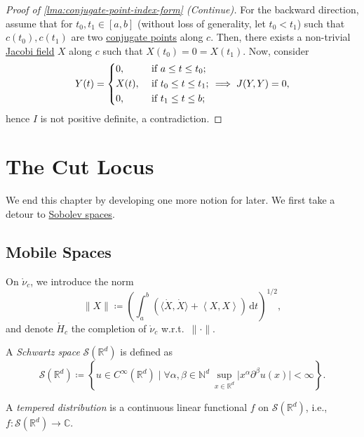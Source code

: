 \begin{proof}[Proof of \autoref{lma:conjugate-point-index-form} (Continue)]
	For the backward direction, assume that for \(t_0, t_1\in [a, b]\) (without loss of generality, let \(t_0 < t_1\)) such that \(c(t_0), c(t_1)\) are two \hyperref[def:conjugate-point]{conjugate points} along \(c\). Then, there exists a non-trivial \hyperref[def:Jacobi-field]{Jacobi field} \(X\) along \(c\) such that \(X(t_0) = 0 = X(t_1)\). Now, consider
	\[
		Y(t) = \begin{dcases}
			0,    & \text{ if } a \leq t \leq t_0 ;   \\
			X(t), & \text{ if } t_0 \leq t \leq t_1 ; \\
			0,    & \text{ if } t_1 \leq t \leq b;
		\end{dcases} \implies J(Y, Y) = 0,
	\]
	hence \(I\) is not positive definite, a contradiction.
\end{proof}

\section{The Cut Locus}
We end this chapter by developing one more notion for later. We first take a detour to \hyperref[def:Sobolev-space]{Sobolev spaces}.

\subsection{Mobile Spaces}
On \(\mathring{\nu }_c\), we introduce the norm
\[
	\lVert X \rVert \coloneqq \left( \int_{a}^{b} \left( \langle \dot{X} , \dot{X} \rangle + \left\langle X, X \right\rangle  \right)  \,\mathrm{d}t \right) ^{1 / 2},
\]
and denote \(\mathring{H}_c\) the completion of \(\mathring{\nu}_c\) w.r.t.\ \(\lVert \cdot \rVert \).

\begin{definition}\label{def:Schwartz-space}
	A \emph{Schwartz space} \(\mathcal{S} (\mathbb{R} ^d)\) is defined as
	\[
		\mathcal{S} (\mathbb{R} ^d) \coloneqq \left\{ u\in C^{\infty} (\mathbb{R} ^d) \mid \forall \alpha , \beta \in \mathbb{N} ^d\ \sup _{x\in \mathbb{R} ^d} \vert x^\alpha \partial ^\beta u(x) \vert < \infty  \right\} .
	\]
\end{definition}

\begin{definition}\label{def:tempered-distribution}
	A \emph{tempered distribution} is a continuous linear functional \(f\) on \(\mathcal{S} (\mathbb{R} ^d)\), i.e., \(f\colon \mathcal{S} (\mathbb{R} ^d) \to \mathbb{C} \).
\end{definition}

